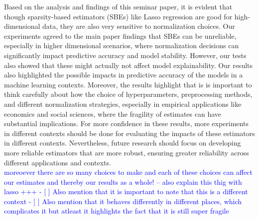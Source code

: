 Based on the analysis and findings of this seminar paper, it is evident that though sparsity-based estimators (SBEs) like Lasso regression are good for high-dimensional data, they are also very sensitive to normalization choices. Our experiments agreed to the main paper findings that SBEs can be unreliable, especially in higher dimensional scenarios, where normalization decisions can significantly impact predictive accuracy and model stability. However, our tests also showed that these might actually not affect model explainability. Our results also highlighted the possible impacts in predictive accuracy of the models in a machine learning contexts. Moreover, the results highlight that is is important to think carefully about how the choice of hyperparameters, preprocessing methods, and different normalization strategies, especially in empirical applications like economics and social sciences, where the fragility of estimates can have substantial implications.  For more confidence in these results, more experiments in different contexts should be done for evaluating the impacts of these estimators in different contexts. Nevertheless, future research should focus on developing more reliable estimators that are more robust, ensuring greater reliability across different applications and contexts.\\

\textcolor{blue}{moreoever there are so many choices to make and each of these choices can affect our estimates and thereby our results as a whole! -- also explain this thig with lasso +++ - [ ] Also mention that it is important to note that this is a different context 
- [ ] Also mention that it behaves differently in different places, which complicates it but atleast it highlights the fact that it is still super fragile
}

 
